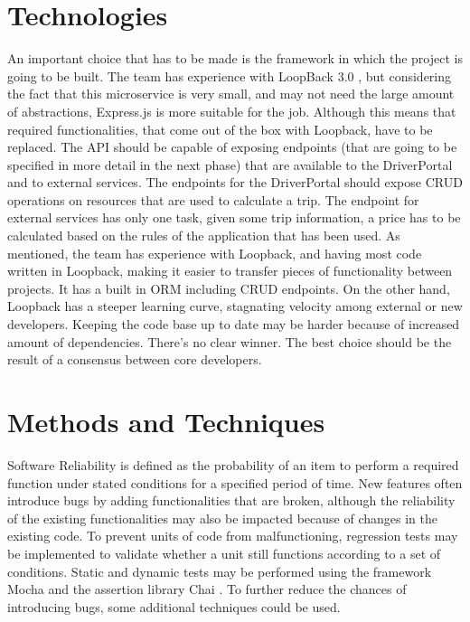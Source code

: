 \section{Technologies}
An important choice that has to be made is the framework in which the project is going to be built. The team has experience with LoopBack 3.0 \cite{lb}, but considering the fact that this microservice is very small, and may not need the large amount of abstractions, Express.js is more suitable for the job. Although this means that required functionalities, that come out of the box with Loopback, have to be replaced. The API should be capable of exposing endpoints (that are going to be specified in more detail in the next phase) that are available to the DriverPortal and to external services. The endpoints for the DriverPortal should expose CRUD operations on resources that are used to calculate a trip. The endpoint for external services has only one task, given some trip information, a price has to be calculated based on the rules of the application that has been used. As mentioned, the team has experience with Loopback, and having most code written in Loopback, making it easier to transfer pieces of functionality between projects. It has a built in ORM including CRUD endpoints. On the other hand, Loopback has a steeper learning curve, stagnating velocity among external or new developers. Keeping the code base up to date may be harder because of increased amount of dependencies. There’s no clear winner. The best choice should be the result of a consensus between core developers.

%
\section{Methods and Techniques}
Software Reliability is defined as the probability of an item to perform a required function under stated conditions for a specified period of time. New features often introduce bugs by adding functionalities that are broken, although the reliability of the existing functionalities may also be impacted because of changes in the existing code. To prevent units of code from malfunctioning, regression tests may be implemented to validate whether a unit still functions according to a set of conditions. Static and dynamic tests may be performed using the framework Mocha \cite{mocha} and the assertion library Chai \cite{chai}. To further reduce the chances of introducing bugs, some additional techniques could be used.


